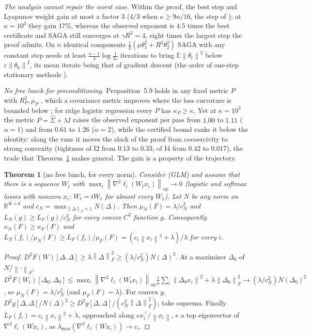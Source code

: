 \documentclass[10pt]{article}
\newtheorem{theorem}{Theorem}
\theoremstyle{remark}
\newcommand{\R}{\mathbb{R}}
\newcommand{\E}{\mathbb{E}}
\newcommand{\norm}[1]{\left\|#1\right\|}
\newcommand{\nop}[1]{\left\|#1\right\|_{\mathrm{op}}}
\newcommand{\nF}[1]{\left\|#1\right\|_{F}}
\newcommand{\kF}{\kappa_{F}}
\newcommand{\lmax}{\lambda_{\max}}
\begin{document}
\begin{description}[leftmargin=2.3em,labelwidth=2.0em,labelsep=0.3em,itemsep=1pt,topsep=3pt,parsep=0pt,font=\normalfont\bfseries]
\item[(C4)] \emph{The analysis cannot repair the worst case.} Within the proof, the best step and Lyapunov weight gain at
most a factor $3$ ($4/3$ when $\kappa\ge9n/16$, the step of \cite{hofmann2015variance}); at $\kappa=10^3$ they gain $17\%$,
whereas the observed exponent is $4.5$ times the best certificate and SAGA still converges at $\gamma R^2=4$, eight times
the largest step the proof admits. On $n$ identical components $\frac12(\mu\theta_1^2+R^2\theta_2^2)$ SAGA with any
constant step needs at least $\frac{\kappa-1}4\log\frac1{2\varepsilon}$ iterations to bring $\E\norm{\theta_t}^2$ below
$\varepsilon\norm{\theta_0}^2$, its mean iterate being that of gradient descent (the order of one-step stationary
methods \cite[Theorem~8]{arjevani2016lower}).
\item[(C5)] \emph{No free lunch for preconditioning.} Proposition~5.9 holds in any fixed metric $P$ with $R_P^2,\mu_P$
\cite{dragomir2021fast}, which a covariance metric improves where the loss curvature is bounded below
\cite{yang2014data,gonen2016solving}; for ridge logistic regression every $P$ has $\kappa_P\ge\kappa$. Yet at
$\kappa=10^3$ the metric $P=\hat\Sigma+\lambda I$ raises the observed exponent per pass from $1.00$ to $1.11$ ($\alpha=1$)
and from $0.61$ to $1.26$ ($\alpha=2$), while the certified bound ranks it below the identity: along the runs it moves the
slack of the proof from cocoercivity to strong convexity (tightness of I2 from $0.13$ to $0.33$, of I4 from $0.42$ to
$0.017$), the trade that Theorem~\ref{thm:nfl} makes general. The gain is a property of the trajectory.
\end{description}

\begin{theorem}[no free lunch, for every norm]\label{thm:nfl}
Consider (GLM) and assume that there is a sequence $W_t$ with $\max_i\nop{\nabla^2\ell_i(W_tx_i)}\to0$ (logistic and
softmax losses with nonzero $x_i$: $W_t=tW_1$ for almost every $W_1$). Let $N$ be any norm on $\R^{K\times d}$ and
$c_N=\max_{\nF\Delta=1}N(\Delta)$. Then $\mu_N(F)=\lambda/c_N^2$ and $L_N(g)\ge L_F(g)/c_N^2$ for every convex $C^2$
function $g$. Consequently $\kappa_N(F)\ge\kF(F)$ and $L_N(f_i)/\mu_N(F)\ge L_F(f_i)/\mu_F(F)=(c_i\norm{x_i}^2+\lambda)/\lambda$
for every $i$.
\end{theorem}
\begin{proof}
$D^2F(W)[\Delta,\Delta]\ge\lambda\nF\Delta^2\ge(\lambda/c_N^2)N(\Delta)^2$. At a maximizer $\Delta_0$ of $N/\nF\cdot$,
$D^2F(W_t)[\Delta_0,\Delta_0]\le\max_i\nop{\nabla^2\ell_i(W_tx_i)}\frac1n\sum_i\norm{\Delta_0x_i}^2+\lambda\nF{\Delta_0}^2
\to(\lambda/c_N^2)N(\Delta_0)^2$, so $\mu_N(F)=\lambda/c_N^2$ (and $\mu_F(F)=\lambda$). For convex $g$,
$D^2g[\Delta,\Delta]/N(\Delta)^2\ge D^2g[\Delta,\Delta]/(c_N^2\nF\Delta^2)$; take suprema. Finally $L_F(f_i)=c_i\norm{x_i}^2+\lambda$,
approached along $ex_i^\top/\norm{x_i}$, $e$ a top eigenvector of $\nabla^2\ell_i(Wx_i)$, as $\lmax(\nabla^2\ell_i(Wx_i))\to c_i$.
\end{proof}
\end{document}
